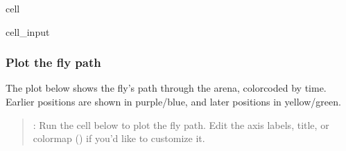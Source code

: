 \documentclass[letterpaper,10pt,english]{jupyterBook}
\begin{document}
\begin{sphinxuseclass}{cell}
\begin{sphinxVerbatimInput}
\begin{sphinxuseclass}{cell_input}
\begin{sphinxVerbatim}[commandchars=\\\{\}]
\end{sphinxVerbatim}

\end{sphinxuseclass}\end{sphinxVerbatimInput}

\end{sphinxuseclass}

\subsubsection{Plot the fly path}
\label{\detokenize{FlyTracking/Script:plot-the-fly-path}}
\sphinxAtStartPar
The plot below shows the fly’s path through the arena, color\sphinxhyphen{}coded by time. Earlier positions are shown in purple/blue, and later positions in yellow/green.
\begin{quote}

\sphinxAtStartPar
{}: Run the cell below to plot the fly path. Edit the axis labels, title, or colormap () if you’d like to customize it.
\end{quote}
\end{document}
